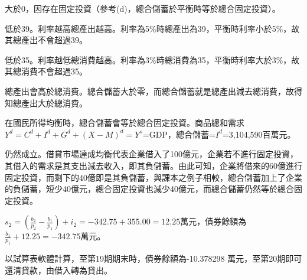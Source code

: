 \documentclass[12pt]{article}
\begin{document}
\begin{CJK}{UTF8}{cwmb}
\begin{num}
\begin{num}
		\item 大於0，因存在固定投資（參考(d)，總合儲蓄於平衡時等於總合固定投資）。
		\item 低於39。利率越高總產出越高。利率為5\%時總產出為39，平衡時利率小於5\%，故其總產出不會超過39。
		\item 低於35。利率越低總消費越高。利率為3\%時總消費為35，平衡時利率大於3\%，故其總消費不會超過35。
		\item 總產出會高於總消費。總合儲蓄大於零，而總合儲蓄就是總產出減去總消費，故得知總產出大於總消費。
	\end{num}
\item 在國民所得均衡時，總合儲蓄會等於總合固定投資。商品總和需求$Y^d=C^d+I^d+G^d+(X-M)^d=Y^s$=GDP，總合儲蓄=$I^d$=3,104,590百萬元。
\item 仍然成立。借貸市場達成均衡代表企業借入了100億元，企業若不進行固定投資，其借入的需求是其支出減去收入，即其負儲蓄。由此可知，企業將借來的60億進行固定投資，而剩下的40億即是其負儲蓄，與課本之例子相較，總合儲蓄加上了企業的負儲蓄，短少40億元，總合固定投資也減少40億元，而總合儲蓄仍然等於總合固定投資。
\item
	\begin{num}
		\item $s_2=(\frac{b_2}{p_2}-\frac{b_1}{p_1})+i_2=-342.75+355.00=12.25$萬元，債券餘額為$\frac{b_1}{p_1}+12.25=-342.75$萬元。
		\item 以試算表軟體計算，至第19期期末時，債券餘額為-10.378298
萬元，至第20期即可還清貸款，由借入轉為貸出。
	\end{num}
\end{num}

\end{CJK}
\end{document}
